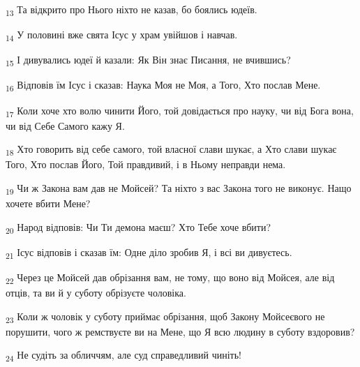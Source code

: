 \begin{tcolorbox}
\textsubscript{13} Та відкрито про Нього ніхто не казав, бо боялись юдеїв.
\end{tcolorbox}
\begin{tcolorbox}
\textsubscript{14} У половині вже свята Ісус у храм увійшов і навчав.
\end{tcolorbox}
\begin{tcolorbox}
\textsubscript{15} І дивувались юдеї й казали: Як Він знає Писання, не вчившись?
\end{tcolorbox}
\begin{tcolorbox}
\textsubscript{16} Відповів їм Ісус і сказав: Наука Моя не Моя, а Того, Хто послав Мене.
\end{tcolorbox}
\begin{tcolorbox}
\textsubscript{17} Коли хоче хто волю чинити Його, той довідається про науку, чи від Бога вона, чи від Себе Самого кажу Я.
\end{tcolorbox}
\begin{tcolorbox}
\textsubscript{18} Хто говорить від себе самого, той власної слави шукає, а Хто слави шукає Того, Хто послав Його, Той правдивий, і в Ньому неправди нема.
\end{tcolorbox}
\begin{tcolorbox}
\textsubscript{19} Чи ж Закона вам дав не Мойсей? Та ніхто з вас Закона того не виконує. Нащо хочете вбити Мене?
\end{tcolorbox}
\begin{tcolorbox}
\textsubscript{20} Народ відповів: Чи Ти демона маєш? Хто Тебе хоче вбити?
\end{tcolorbox}
\begin{tcolorbox}
\textsubscript{21} Ісус відповів і сказав їм: Одне діло зробив Я, і всі ви дивуєтесь.
\end{tcolorbox}
\begin{tcolorbox}
\textsubscript{22} Через це Мойсей дав обрізання вам, не тому, що воно від Мойсея, але від отців, та ви й у суботу обрізуєте чоловіка.
\end{tcolorbox}
\begin{tcolorbox}
\textsubscript{23} Коли ж чоловік у суботу приймає обрізання, щоб Закону Мойсеєвого не порушити, чого ж ремствуєте ви на Мене, що Я всю людину в суботу вздоровив?
\end{tcolorbox}
\begin{tcolorbox}
\textsubscript{24} Не судіть за обличчям, але суд справедливий чиніть!
\end{tcolorbox}
